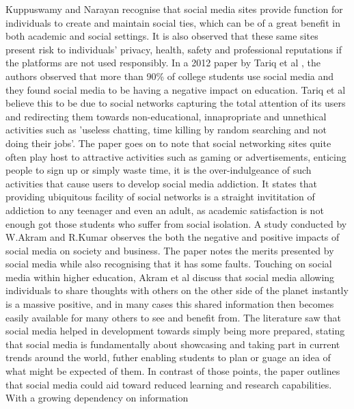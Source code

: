\documentclass[lettersize,journal]{IEEEtran}
\begin{document}
    Kuppuswamy and Narayan \cite{Kuppuswamy et al 2010} recognise that social
    media sites provide function for individuals to create and maintain social
    ties, which can be of a great benefit in both academic and social settings.
    It is also observed that these same sites present risk to individuals'
    privacy, health, safety and professional reputations if the platforms are
    not used responsibly.
    In a 2012 paper by Tariq et al \cite{Tariq et al 2012}, the authors observed that more than 90\%
    of college students use social media \cite{Ellison et al 2007} and they found social media to be
    having a negative impact on education. Tariq et al believe this to be due to social networks
    capturing the total attention of its users and redirecting them towards non-educational, innapropriate
    and unnethical activities such as 'useless chatting, time killing by random searching and not doing their jobs'. The paper
    goes on to note that social networking sites quite often play host to attractive activities such
    as gaming or advertisements, enticing people to sign up or simply waste time, it is the over-indulgeance
    of such activities that cause users to develop social media addiction. It states that providing ubiquitous
    facility of social networks is a straight invititation of addiction to any teenager and even an adult, as
    academic satisfaction is not enough got those students who suffer from social isolation\cite{Pempek et al 2009}.    
    A study conducted by W.Akram and R.Kumar \cite{Akram et al 2017} observes the both the negative
    and positive impacts of social media on society and business.  The paper notes the merits presented by social media
    while also recognising that it has some faults. Touching on social media within higher education, Akram et al
    discuss that social media allowing individuals to share thoughts with others on the other side of the planet instantly
    is a massive positive, and in many cases this shared information then becomes easily available for many others to
    see and benefit from. The literature saw that social media helped in development towards simply being more prepared, stating that
    social media is fundamentally about showcasing and taking part in  current trends around the world, futher enabling students
    to plan or guage an idea of what might be expected of them. In contrast of those points, the paper outlines that
    social media could aid toward reduced learning and research capabilities. With a growing dependency on information
\end{document}
